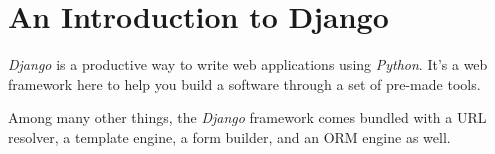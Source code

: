 \section{An Introduction to Django}
    \emph{Django} is a productive way to write web applications using \emph{Python}.
    It's a web framework here to help you build a software through a set of pre-made tools.

    Among many other things, the \emph{Django} framework comes bundled with a URL resolver, 
    a template engine, a form builder, and an ORM engine as well.
